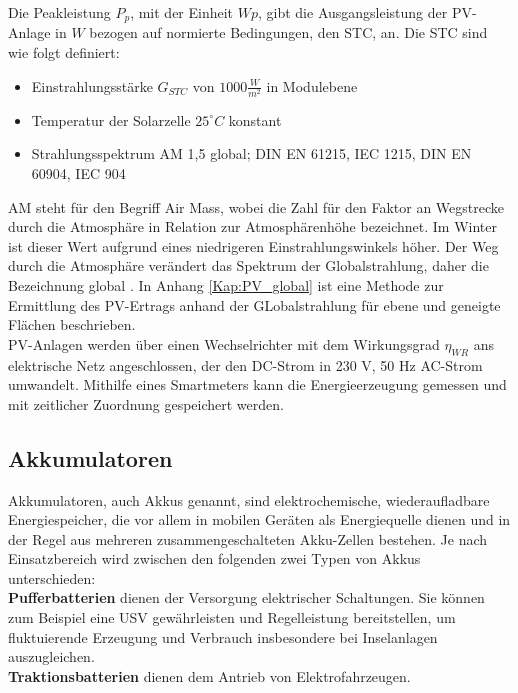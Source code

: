 		Die Peakleistung $P_p$, mit der Einheit $Wp$, gibt die Ausgangsleistung der PV-Anlage in $W$ bezogen auf normierte Bedingungen, den \ac{STC}, an. Die STC sind wie folgt definiert:
		\begin{itemize}
			\item Einstrahlungsstärke $G_{STC}$ von $1000 \frac{W}{m^2}$ in Modulebene
			\item Temperatur der Solarzelle $25 ^{\circ} C$ konstant
			\item Strahlungsspektrum AM 1,5 global; DIN EN 61215, IEC 1215, DIN EN 60904, IEC 904 
		\end{itemize}
		AM steht für den Begriff Air Mass, wobei die Zahl für den Faktor an Wegstrecke durch die Atmosphäre in Relation zur Atmosphärenhöhe bezeichnet. Im Winter ist dieser Wert aufgrund eines niedrigeren Einstrahlungswinkels höher. Der Weg durch die Atmosphäre verändert das Spektrum der Globalstrahlung, daher die Bezeichnung \glqq global \grqq. In Anhang \ref{Kap:PV_global} ist eine Methode zur Ermittlung des PV-Ertrags anhand der GLobalstrahlung für ebene und geneigte Flächen beschrieben.\\
		
		PV-Anlagen werden über einen Wechselrichter mit dem Wirkungsgrad $\eta_{WR}$ ans elektrische Netz angeschlossen, der den DC-Strom in 230 V, 50 Hz AC-Strom umwandelt. Mithilfe eines Smartmeters kann die Energieerzeugung gemessen und mit zeitlicher Zuordnung gespeichert werden.


		
	\subsection{Akkumulatoren}
   	\label{Kap:Akkus}
		Akkumulatoren, auch Akkus genannt, sind elektrochemische, wiederaufladbare Energiespeicher, die vor allem in mobilen Geräten als Energiequelle dienen und in der Regel aus mehreren zusammengeschalteten Akku-Zellen bestehen. Je nach Einsatzbereich wird zwischen den folgenden zwei Typen von Akkus unterschieden: \\

		\textbf{Pufferbatterien} dienen der Versorgung elektrischer Schaltungen. Sie können zum Beispiel eine \ac{USV} gewährleisten und Regelleistung bereitstellen, um fluktuierende Erzeugung und Verbrauch insbesondere bei Inselanlagen auszugleichen. \\
		
		\textbf{Traktionsbatterien} dienen dem Antrieb von Elektrofahrzeugen.
		
